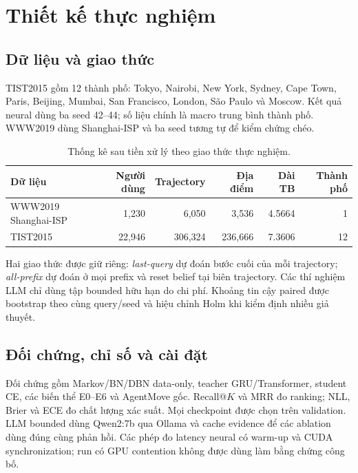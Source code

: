 \documentclass[runningheads]{llncs}
\begin{document}
\section{Thiết kế thực nghiệm}

\subsection{Dữ liệu và giao thức}

TIST2015 gồm 12 thành phố: Tokyo, Nairobi, New York, Sydney, Cape Town, Paris, Beijing, Mumbai, San Francisco, London, São Paulo và Moscow. Kết quả neural dùng ba seed 42--44; số liệu chính là macro trung bình thành phố. WWW2019 dùng Shanghai-ISP và ba seed tương tự để kiểm chứng chéo.

\begin{table}[!htbp]
\caption{Thống kê sau tiền xử lý theo giao thức thực nghiệm.}
\label{tab:data}
\centering
\small
\begin{tabular}{@{}lrrrrr@{}}
\toprule
Dữ liệu & Người dùng & Trajectory & Địa điểm & Dài TB & Thành phố\\
\midrule
WWW2019 Shanghai-ISP & 1,230 & 6,050 & 3,536 & 4.5664 & 1\\
TIST2015 & 22,946 & 306,324 & 236,666 & 7.3606 & 12\\
\bottomrule
\end{tabular}
\end{table}

Hai giao thức được giữ riêng: \emph{last-query} dự đoán bước cuối của mỗi trajectory; \emph{all-prefix} dự đoán ở mọi prefix và reset belief tại biên trajectory. Các thí nghiệm LLM chỉ dùng tập bounded hữu hạn do chi phí. Khoảng tin cậy paired được bootstrap theo cùng query/seed và hiệu chỉnh Holm khi kiểm định nhiều giả thuyết.

\subsection{Đối chứng, chỉ số và cài đặt}

Đối chứng gồm Markov/BN/DBN data-only, teacher GRU/Transformer, student CE, các biến thể E0--E6 và AgentMove gốc. Recall@$K$ và MRR đo ranking; NLL, Brier và ECE đo chất lượng xác suất. Mọi checkpoint được chọn trên validation. LLM bounded dùng Qwen2:7b qua Ollama và cache evidence để các ablation dùng đúng cùng phản hồi. Các phép đo latency neural có warm-up và CUDA synchronization; run có GPU contention không được dùng làm bằng chứng công bố.
\end{document}
